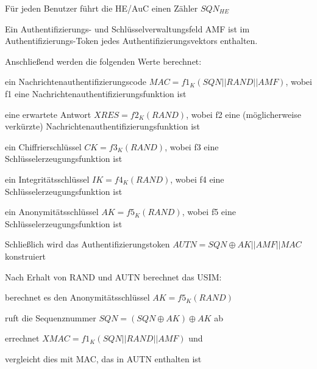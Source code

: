 \documentclass[a4paper]{article}
\begin{document}
\begin{multicols}{3}
\begin{itemize*}
\begin{itemize*}
                  \begin{itemize*}
                        \item Für jeden Benutzer führt die HE/AuC einen Zähler $SQN_{HE}$
                  \end{itemize*}
                  \item Ein Authentifizierungs- und Schlüsselverwaltungsfeld AMF ist im Authentifizierungs-Token jedes Authentifizierungsvektors enthalten.
                  \item Anschließend werden die folgenden Werte berechnet:
                  \begin{itemize*}
                        \item ein Nachrichtenauthentifizierungscode $MAC = f1_K(SQN || RAND || AMF)$, wobei f1 eine Nachrichtenauthentifizierungsfunktion ist
                        \item eine erwartete Antwort $XRES = f2_K(RAND)$, wobei f2 eine (möglicherweise verkürzte) Nachrichtenauthentifizierungsfunktion ist
                        \item ein Chiffrierschlüssel $CK = f3_K(RAND)$, wobei f3 eine Schlüsselerzeugungsfunktion ist
                        \item ein Integritätsschlüssel $IK = f4_K(RAND)$, wobei f4 eine Schlüsselerzeugungsfunktion ist
                        \item ein Anonymitätsschlüssel $AK = f5_K(RAND)$, wobei f5 eine Schlüsselerzeugungsfunktion ist
                  \end{itemize*}
                  \item Schließlich wird das Authentifizierungstoken $AUTN = SQN \oplus AK || AMF || MAC$ konstruiert
            \end{itemize*}
            \begin{itemize*}
                  \item Nach Erhalt von RAND und AUTN berechnet das USIM:
                  \item berechnet es den Anonymitätsschlüssel $AK = f5_K (RAND)$
                  \item ruft die Sequenznummer $SQN = (SQN \oplus AK) \oplus AK$ ab
                  \item errechnet $XMAC = f1_K (SQN || RAND || AMF)$ und
                  \item vergleicht dies mit MAC, das in AUTN enthalten ist

\end{itemize*}
\end{itemize*}
\end{multicols}
\end{document}
